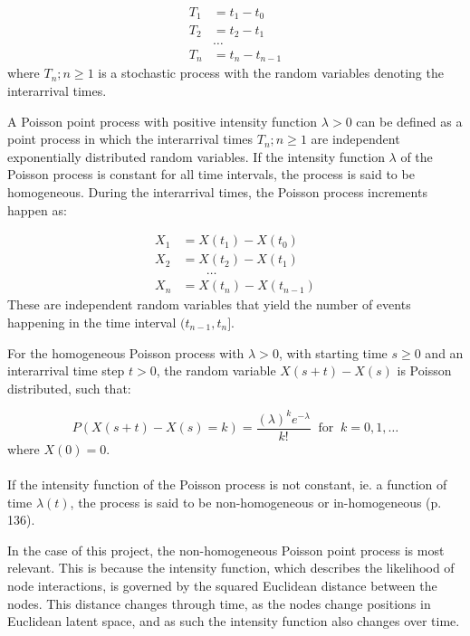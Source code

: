 \begin{align*}
T_1 &= t_1 - t_0 \\
T_2 &= t_2 - t_1 \\
&\dots \\
T_n &= t_n - t_{n-1}
\end{align*}
where ${T_n ; n \ge 1}$ is a stochastic process with the random variables denoting the interarrival times.

A Poisson point process with positive intensity function $\lambda > 0$ can be defined as a point process in which the interarrival times ${T_n ; n \ge 1}$ are independent exponentially distributed random variables. 
If the intensity function $\lambda$ of the Poisson process is constant for all time intervals, the process is said to be homogeneous. 
During the interarrival times, the Poisson process increments happen as:

\begin{align*}
X_1 &= X(t_1) - X(t_0) \\
X_2 &= X(t_2) - X(t_1) \\
&\;\;\;\;\;\;\;\dots \\
X_n &= X(t_n) - X(t_{n-1})
\end{align*}
These are independent random variables that yield the number of events happening in the time interval $(t_{n-1}, t_n]$. 

For the homogeneous Poisson process with $\lambda > 0$, with starting time $s \ge 0$ and an interarrival time step $t > 0$, the random variable $X(s+t) - X(s)$ is Poisson distributed, such that:

\begin{equation}
    P(X(s+t) - X(s) = k) = \frac{(\lambda)^k e^{-\lambda}}{k!} \;\; \text{for} \;\; k=0,1,\dots
\end{equation}
where $X(0) = 0$.
\\\\
If the intensity function of the Poisson process is not constant, ie. a function of time $\lambda(t)$, the process is said to be non-homogeneous or in-homogeneous \cite{Bas2019AProcess} (p. 136).

In the case of this project, the non-homogeneous Poisson point process is most relevant. 
This is because the intensity function, which describes the likelihood of node interactions, is governed by the squared Euclidean distance between the nodes. 
This distance changes through time, as the nodes change positions in Euclidean latent space, and as such the intensity function also changes over time.


